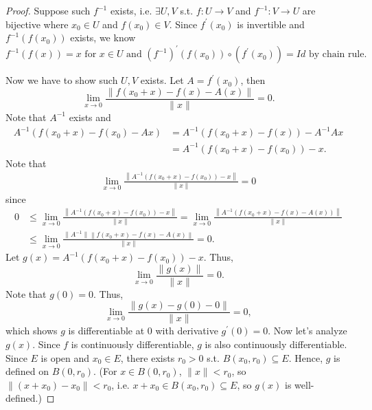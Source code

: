 \begin{proof}
    Suppose such \(f^{-1}\) exists, i.e. \(\exists U, V\) s.t. \(f: U \to V\) and \(f^{-1} : V \to U\) are bijective where \(x_0 \in U\) and \(f(x_0) \in V\). Since \(f^{\prime} (x_0)\) is invertible and \(f^{-1} (f(x_0))\) exists, we know 
    \[
        f^{-1} (f(x)) = x \text{ for } x \in U \text{ and } \left( f^{-1} \right)^{\prime} (f(x_0)) \circ (f^{\prime} (x_0)) = Id \text{ by chain rule.}    
    \] 

    Now we have to show such \(U, V\) exists. Let \(A = f^{\prime} (x_0)\), then 
    \[
        \lim_{x \to 0} \frac{\left\lVert f(x_0 + x) - f(x) - A(x) \right\rVert }{\lVert x \rVert } = 0.
    \]      
    Note that \(A^{-1}\) exists and 
    \begin{align*}
        A^{-1} \left( f(x_0 + x) - f(x_0) - Ax \right) &= A^{-1} (f(x_0 + x) - f(x)) - A^{-1} Ax \\
        &= A^{-1} \left( f(x_0 + x) - f(x_0) \right) - x.   
    \end{align*}   
    Note that 
    \begin{align*}
        \lim_{x \to 0} \frac{\left\lVert A^{-1} (f(x_0 + x) - f(x_0)) - x\right\rVert }{\lVert x \rVert } = 0 
    \end{align*}
    since 
    \begin{align*}
       0 &\le \lim_{x \to 0} \frac{\left\lVert A^{-1} (f(x_0 + x) - f(x_0)) - x\right\rVert }{\lVert x \rVert } = \lim_{x \to 0} \frac{  \left\lVert A^{-1} \left( f(x_0 + x) - f(x) - A(x) \right)  \right\rVert  }{\lVert x \rVert } \\
       &\le \lim_{x \to 0} \frac{\lVert A^{-1} \rVert \left\lVert f(x_0 + x) - f(x) - A(x) \right\rVert  }{\lVert x \rVert } = 0. 
    \end{align*}
    Let \(g(x) = A^{-1} (f(x_0 + x) - f(x_0)) - x\). Thus, 
    \[
        \lim_{x \to 0} \frac{\lVert g(x) \rVert }{\lVert x \rVert } = 0. 
    \]
    Note that \(g(0) = 0\). Thus, 
    \[
        \lim_{x \to 0} \frac{\lVert g(x) - g(0) - 0 \rVert }{\lVert x \rVert } = 0, 
    \] which shows \(g\) is differentiable at \(0\) with derivative \(g^{\prime} (0) = 0\). Now let's analyze \(g(x)\). Since \(f\) is continuously differentiable, \(g\) is also continuously differentiable. Since \(E\) is open and \(x_0 \in E\), there exists \(r_0 > 0\) s.t. \(B(x_0, r_0) \subseteq E\). Hence, \(g\) is defined on \(B(0, r_0)\). (For \(x \in B(0, r_0)\), \(\lVert x \rVert < r_0 \), so \(\lVert (x + x_0) - x_0 \rVert < r_0 \), i.e. \(x + x_0 \in B(x_0, r_0) \subseteq E\), so \(g(x)\) is well-defined.)      


\end{proof}
